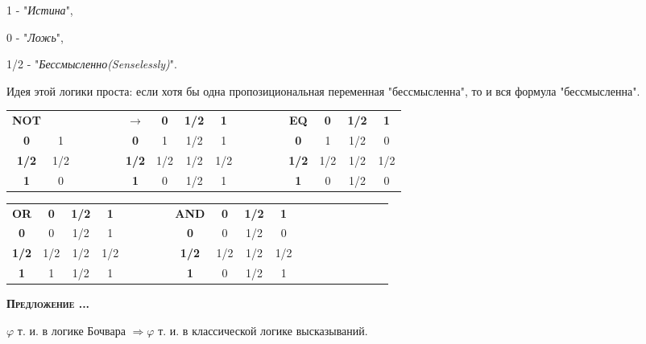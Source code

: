\documentclass[18pt, a4paper]{extarticle}
\newcounter{par}
\newcounter{spar}
\newcounter{zap}
\newcommand{\predl}{\textbf{\textsc{Предложение \thepar.\if\thespar1\thespar.\fi\thezap.\;}}\stepcounter{zap}}
\begin{document}
1 - "\textit{Истина}"{}, 

0 - "\textit{Ложь}"{}, 

1/2 - "\textit{Бессмысленно(Senselessly)}"{}.

Идея этой логики проста: если хотя бы одна пропозициональная переменная "бессмысленна"{}, то и вся формула "бессмысленна"{}.

\begin{center}
\begin{tabular}{|c|c|llll|c|c|c|c|llll|c|c|c|c|}
\cline{1-2} \cline{7-10} \cline{15-18}
\textbf{NOT} & & & & & & \textbf{$\rightarrow$} & \textbf{0} & \textbf{1/2} & \textbf{1} & & & & & \textbf{EQ} & \textbf{0} & \textbf{1/2} & \textbf{1} \\
\cline{1-2} \cline{7-10} \cline{15-18}
\textbf{0} & 1 & & & & & \textbf{0} & 1 & 1/2 & 1 & & & & & \textbf{0} & 1 & 1/2 & 0 \\
\cline{1-2} \cline{7-10} \cline{15-18}
\textbf{1/2} & 1/2 & & & & & \textbf{1/2} & 1/2 & 1/2 & 1/2 & & & & & \textbf{1/2} & 1/2 & 1/2 & 1/2 \\
\cline{1-2} \cline{7-10} \cline{15-18}
\textbf{1} & 0 & & & & & \textbf{1} & 0 & 1/2 & 1  & & & & & \textbf{1} & 0 & 1/2 & 0 \\
\cline{1-2} \cline{7-10} \cline{15-18}
\end{tabular}
\end{center}

\begin{center}
\begin{tabular}{|c|c|c|c|llll|c|c|c|c|llll|c|c|c|c|}
\cline{1-4} \cline{9-12}
\textbf{OR} & \textbf{0} & \textbf{1/2} & \textbf{1} & & & & & \textbf{AND} & \textbf{0} & \textbf{1/2} & \textbf{1} \\
\cline{1-4} \cline{9-12}
\textbf{0} & 0 & 1/2 & 1 & & & & & \textbf{0} & 0 & 1/2 & 0 \\ 
\cline{1-4} \cline{9-12}
\textbf{1/2} & 1/2 & 1/2 & 1/2 & & & & & \textbf{1/2} & 1/2 & 1/2 & 1/2 \\ 
\cline{1-4} \cline{9-12}
\textbf{1} & 1 & 1/2 & 1 & & & & & \textbf{1} & 0 & 1/2 & 1 \\ 
\cline{1-4} \cline{9-12}
\end{tabular}
\end{center}

\predl

$\varphi$ т. и. в логике Бочвара $\Rightarrow \varphi$ т. и. в классической логике высказываний.\\
\end{document}
